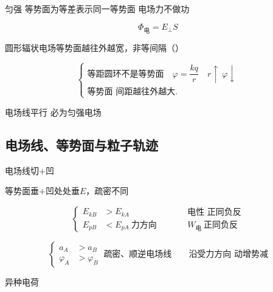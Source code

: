 匀强 等势面为等差表示\qquad 同一等势面 电场力不做功

\[
\Phi_{\text{电}}=E_{\perp}S
\]


圆形辐状电场等势面越往外越宽，非等间隔（）

\[
\left\{\begin{array}{l}
\text{等距圆环不是等势面}\quad \varphi=\dfrac{kq}{r}\quad r\uparrow\ \varphi\downarrow\\[3ex]
\text{等势面 间距越往外越大.}
\end{array}\right.
\]

电场线平行 必为匀强电场

\subsection{电场线、等势面与粒子轨迹}
电场线\quad 切$+$凹

等势面\quad 垂$+$凹\quad 处处垂$E$，疏密不同


\[
\left\{\begin{aligned}
E_{kB}&>E_{kA}\\
E_{pB}&<E_{pA}\ \text{力方向}
\end{aligned}\right.
\qquad
\begin{aligned}
&\text{电性\ 正同负反}\\
&W_{\text{电}}\ \text{正同负反}
\end{aligned}
\]

\[
\left\{\begin{aligned}
a_A&>a_B\\
\varphi_A&>\varphi_B
\end{aligned}\right.
\ \text{疏密、顺逆电场线}
\qquad
\text{沿受力方向\ 动增势减}
\]


异种电荷

